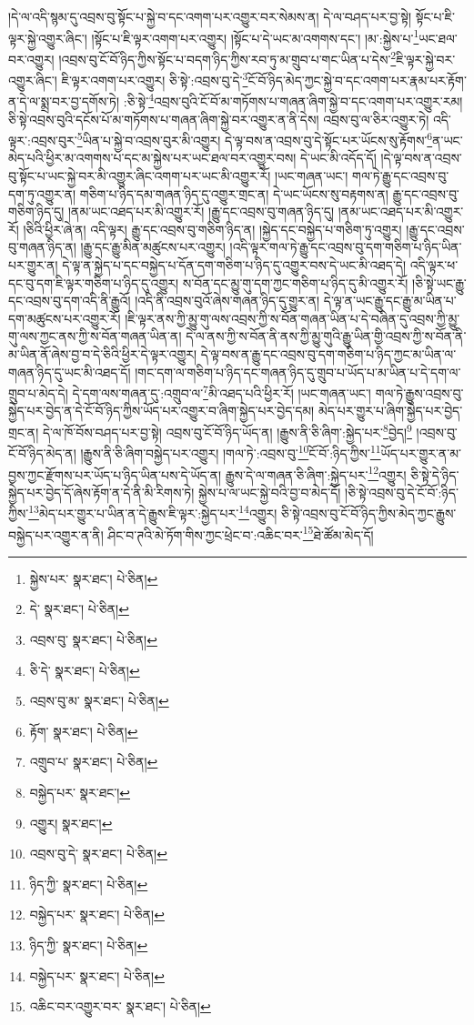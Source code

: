 །དེ་ལ་འདི་སྙམ་དུ་འབྲས་བུ་སྟོང་པ་སྐྱེ་བ་དང་འགག་པར་འགྱུར་བར་སེམས་ན། དེ་ལ་བཤད་པར་བྱ་སྟེ། སྟོང་པ་ཇི་ལྟར་སྐྱེ་འགྱུར་ཞིང་། །སྟོང་པ་ཇི་ལྟར་འགག་པར་འགྱུར། །སྟོང་པ་དེ་ཡང་མ་འགགས་དང་། །མ་:སྐྱེས་པ་\footnote{སྐྱེས་པར་  སྣར་ཐང་།  པེ་ཅིན། }ཡང་ཐལ་བར་འགྱུར། །འབྲས་བུ་ངོ་བོ་ཉིད་ཀྱིས་སྟོང་པ་བདག་ཉིད་ཀྱིས་རབ་ཏུ་མ་གྲུབ་པ་གང་ཡིན་པ་དེས་\footnote{དེ་  སྣར་ཐང་།  པེ་ཅིན། }ཇི་ལྟར་སྐྱེ་བར་འགྱུར་ཞིང་། ཇི་ལྟར་འགག་པར་འགྱུར། ཅི་སྟེ་:འབྲས་བུ་དེ་\footnote{འབྲས་བུ་  སྣར་ཐང་།  པེ་ཅིན། }ངོ་བོ་ཉིད་མེད་ཀྱང་སྐྱེ་བ་དང་འགག་པར་རྣམ་པར་རྟོག་ན་དེ་ལ་སྨྲ་བར་བྱ་དགོས་ཏེ། :ཅི་སྟེ་\footnote{ཅི་དེ་  སྣར་ཐང་།  པེ་ཅིན། }འབྲས་བུའི་ངོ་བོ་མ་གཏོགས་པ་གཞན་ཞིག་སྐྱེ་བ་དང་འགག་པར་འགྱུར་རམ། ཅི་སྟེ་འབྲས་བུའི་དངོས་པོ་མ་གཏོགས་པ་གཞན་ཞིག་སྐྱེ་བར་འགྱུར་ན་ནི་དེས། འབྲས་བུ་ལ་ཅིར་འགྱུར་ཏེ། འདི་ལྟར་:འབྲས་བུར་\footnote{འབྲས་བུ་མ་  སྣར་ཐང་།  པེ་ཅིན། }ཡིན་པ་སྐྱེ་བ་འབྲས་བུར་མི་འགྱུར། དེ་ལྟ་བས་ན་འབྲས་བུ་དེ་སྟོང་པར་ཡོངས་སུ་རྟོགས་\footnote{རྟོག་  སྣར་ཐང་།  པེ་ཅིན། }ན་ཡང་མེད་པའི་ཕྱིར་མ་འགགས་པ་དང་མ་སྐྱེས་པར་ཡང་ཐལ་བར་འགྱུར་བས། དེ་ཡང་མི་འདོད་དོ། །དེ་ལྟ་བས་ན་འབྲས་བུ་སྟོང་པ་ཡང་སྐྱེ་བར་མི་འགྱུར་ཞིང་འགག་པར་ཡང་མི་འགྱུར་རོ། །ཡང་གཞན་ཡང་། གལ་ཏེ་རྒྱུ་དང་འབྲས་བུ་དག་ཏུ་འགྱུར་ན། གཅིག་པ་ཉིད་དམ་གཞན་ཉིད་དུ་འགྱུར་གྲང་ན། དེ་ཡང་ཡོངས་སུ་བརྟགས་ན། རྒྱུ་དང་འབྲས་བུ་གཅིག་ཉིད་དུ། །ནམ་ཡང་འཐད་པར་མི་འགྱུར་རོ། །རྒྱུ་དང་འབྲས་བུ་གཞན་ཉིད་དུ། །ནམ་ཡང་འཐད་པར་མི་འགྱུར་རོ། །ཅིའི་ཕྱིར་ཞེ་ན། འདི་ལྟར། རྒྱུ་དང་འབྲས་བུ་གཅིག་ཉིད་ན། །སྐྱེད་དང་བསྐྱེད་པ་གཅིག་ཏུ་འགྱུར། །རྒྱུ་དང་འབྲས་བུ་གཞན་ཉིད་ན། །རྒྱུ་དང་རྒྱུ་མིན་མཚུངས་པར་འགྱུར། །འདི་ལྟར་གལ་ཏེ་རྒྱུ་དང་འབྲས་བུ་དག་གཅིག་པ་ཉིད་ཡིན་པར་གྱུར་ན། དེ་ལྟ་ན་སྐྱེད་པ་དང་བསྐྱེད་པ་དོན་དག་གཅིག་པ་ཉིད་དུ་འགྱུར་བས་དེ་ཡང་མི་འཐད་དེ། འདི་ལྟར་ཕ་དང་བུ་དག་ཇི་ལྟར་གཅིག་པ་ཉིད་དུ་འགྱུར། ས་བོན་དང་མྱུ་གུ་དག་ཀྱང་གཅིག་པ་ཉིད་དུ་མི་འགྱུར་རོ། །ཅི་སྟེ་ཡང་རྒྱུ་དང་འབྲས་བུ་དག་འདི་ནི་རྒྱུའོ། །འདི་ནི་འབྲས་བུའོ་ཞེས་གཞན་ཉིད་དུ་གྱུར་ན། དེ་ལྟ་ན་ཡང་རྒྱུ་དང་རྒྱུ་མ་ཡིན་པ་དག་མཚུངས་པར་འགྱུར་རོ། །ཇི་ལྟར་ནས་ཀྱི་མྱུ་གུ་ལས་འབྲས་ཀྱི་ས་བོན་གཞན་ཡིན་པ་དེ་བཞིན་དུ་འབྲས་ཀྱི་མྱུ་གུ་ལས་ཀྱང་ནས་ཀྱི་ས་བོན་གཞན་ཡིན་ན། དེ་ལ་ནས་ཀྱི་ས་བོན་ནི་ནས་ཀྱི་མྱུ་གུའི་རྒྱུ་ཡིན་གྱི་འབྲས་ཀྱི་ས་བོན་ནི་མ་ཡིན་ནོ་ཞེས་བྱ་བ་དེ་ཅིའི་ཕྱིར་དེ་ལྟར་འགྱུར། དེ་ལྟ་བས་ན་རྒྱུ་དང་འབྲས་བུ་དག་གཅིག་པ་ཉིད་ཀྱང་མ་ཡིན་ལ་གཞན་ཉིད་དུ་ཡང་མི་འཐད་དོ། །གང་དག་ལ་གཅིག་པ་ཉིད་དང་གཞན་ཉིད་དུ་གྲུབ་པ་ཡོད་པ་མ་ཡིན་པ་དེ་དག་ལ་གྲུབ་པ་མེད་དེ། དེ་དག་ལས་གཞན་དུ་:འགྲུབ་ལ་\footnote{འགྲུབ་པ་  སྣར་ཐང་།  པེ་ཅིན། }མི་འཐད་པའི་ཕྱིར་རོ། །ཡང་གཞན་ཡང་། གལ་ཏེ་རྒྱུས་འབྲས་བུ་སྐྱེད་པར་བྱེད་ན་དེ་ངོ་བོ་ཉིད་ཀྱིས་ཡོད་པར་འགྱུར་བ་ཞིག་སྐྱེད་པར་བྱེད་དམ། མེད་པར་གྱུར་པ་ཞིག་སྐྱེད་པར་བྱེད་གྲང་ན། དེ་ལ་ཁོ་བོས་བཤད་པར་བྱ་སྟེ། འབྲས་བུ་ངོ་བོ་ཉིད་ཡོད་ན། །རྒྱུས་ནི་ཅི་ཞིག་:སྐྱེད་པར་\footnote{བསྐྱེད་པར་  སྣར་ཐང་། }བྱེད།\footnote{འགྱུར།  སྣར་ཐང་། } །འབྲས་བུ་ངོ་བོ་ཉིད་མེད་ན། །རྒྱུས་ནི་ཅི་ཞིག་བསྐྱེད་པར་འགྱུར། །གལ་ཏེ་:འབྲས་བུ་\footnote{འབྲས་བུ་དེ་  སྣར་ཐང་།  པེ་ཅིན། }ངོ་བོ་:ཉིད་ཀྱིས་\footnote{ཉིད་ཀྱི་  སྣར་ཐང་།  པེ་ཅིན། }ཡོད་པར་གྱུར་ན་མ་བྱས་ཀྱང་རྫོགས་པར་ཡོད་པ་ཉིད་ཡིན་པས་དེ་ཡོད་ན། རྒྱུས་དེ་ལ་གཞན་ཅི་ཞིག་:སྐྱེད་པར་\footnote{བསྐྱེད་པར་  སྣར་ཐང་།  པེ་ཅིན། }འགྱུར། ཅི་སྟེ་དེ་ཉིད་སྐྱེད་པར་བྱེད་དོ་ཞེས་རྟོག་ན་དེ་ནི་མི་རིགས་ཏེ། སྐྱེས་པ་ལ་ཡང་སྐྱེ་བའི་བྱ་བ་མེད་དོ། །ཅི་སྟེ་འབྲས་བུ་དེ་ངོ་བོ་:ཉིད་ཀྱིས་\footnote{ཉིད་ཀྱི་  སྣར་ཐང་།  པེ་ཅིན། }མེད་པར་གྱུར་པ་ཡིན་ན་དེ་རྒྱུས་ཇི་ལྟར་:སྐྱེད་པར་\footnote{བསྐྱེད་པར་  སྣར་ཐང་།  པེ་ཅིན། }འགྱུར། ཅི་སྟེ་འབྲས་བུ་ངོ་བོ་ཉིད་ཀྱིས་མེད་ཀྱང་རྒྱུས་བསྐྱེད་པར་འགྱུར་ན་ནི། ཤིང་བ་ཊའི་མེ་ཏོག་གིས་ཀྱང་ཕྲེང་བ་:འཆིང་བར་\footnote{འཆིང་བར་འགྱུར་བར་  སྣར་ཐང་།  པེ་ཅིན། }ཐེ་ཚོམ་མེད་དོ། 